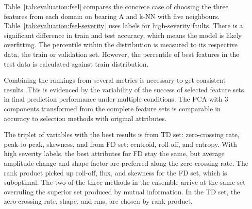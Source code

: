 Table~\ref{tab:evaluation:fsel} compares the concrete case of choosing the three features from each domain on bearing A and k-NN with five neighbours. Table~\ref{tab:evaluation:fsel-severity} uses labels for high-severity faults. There is a significant difference in train and test accuracy, which means the model is likely overfitting. The percentile within the distribution is measured to its respective data, the train or validation set. However, the percentile of best features in the test data is calculated against train distribution.

Combining the rankings from several metrics is necessary to get consistent results. This is evidenced by the variability of the success of selected feature sets in final prediction performance under multiple conditions. The PCA with 3 components transformed from the complete feature sets is comparable in accuracy to selection methods with original attributes.

The triplet of variables with the best results is from TD set: zero-crossing rate, peak-to-peak, skewness, and from FD set: centroid, roll-off, and entropy. With high severity labels, the best attributes for FD stay the same, but average amplitude change and shape factor are preferred along the zero-crossing rate. The rank product picked up roll-off, flux, and skewness for the FD set, which is suboptimal. The two of the three methods in the ensemble arrive at the same set overruling the superior set produced by mutual information. In the TD set, the zero-crossing rate, shape, and rms, are chosen by rank product. 

